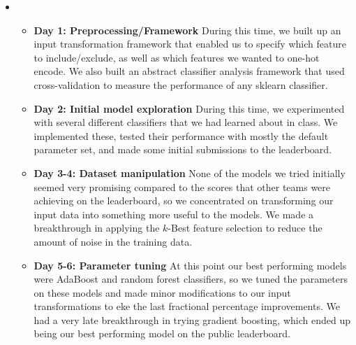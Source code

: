 \begin{itemize}
    \item {}
    \begin{itemize}
    \item \textbf{Day 1: Preprocessing/Framework} During this time, we built up an input transformation framework that enabled us to specify which feature to include/exclude, as well as which features we wanted to one-hot encode. We also built an abstract classifier analysis framework that used cross-validation to measure the performance of any sklearn classifier. 
    \item \textbf{Day 2: Initial model exploration} During this time, we experimented with several different classifiers that we had learned about in class. We implemented these, tested their performance with mostly the default parameter set, and made some initial submissions to the leaderboard.
    \item \textbf{Day 3-4: Dataset manipulation} None of the models we tried initially seemed very promising compared to the scores that other teams were achieving on the leaderboard, so we concentrated on transforming our input data into something more useful to the models. We made a breakthrough in applying the $k$-Best feature selection to reduce the amount of noise in the training data.
    \item \textbf{Day 5-6: Parameter tuning} At this point our best performing models were AdaBoost and random forest classifiers, so we tuned the parameters on these models and made minor modifications to our input transformations to eke the last fractional percentage improvements. We had a very late breakthrough in trying gradient boosting, which ended up being our best performing model on the public leaderboard. 
    \end{itemize}

\end{itemize}



